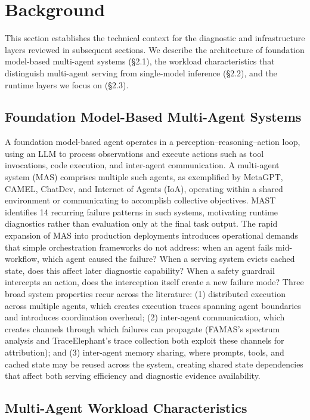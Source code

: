 \documentclass[preprint,12pt]{elsarticle}
\begin{document}
\section{Background}
This section establishes the technical context for the diagnostic and infrastructure layers reviewed in subsequent sections. We describe the architecture of foundation model-based multi-agent systems (\S{}2.1), the workload characteristics that distinguish multi-agent serving from single-model inference (\S{}2.2), and the runtime layers we focus on (\S{}2.3).


\subsection{Foundation Model-Based Multi-Agent Systems}



A foundation model-based agent operates in a perception--reasoning--action loop, using an LLM to process observations and execute actions such as tool invocations, code execution, and inter-agent communication. A multi-agent system (MAS) comprises multiple such agents, as exemplified by MetaGPT, CAMEL, ChatDev, and Internet of Agents (IoA), operating within a shared environment or communicating to accomplish collective objectives. MAST \cite{v5ref5} identifies 14 recurring failure patterns in such systems, motivating runtime diagnostics rather than evaluation only at the final task output. The rapid expansion of MAS into production deployments introduces operational demands that simple orchestration frameworks do not address: when an agent fails mid-workflow, which agent caused the failure? When a serving system evicts cached state, does this affect later diagnostic capability? When a safety guardrail intercepts an action, does the interception itself create a new failure mode? Three broad system properties recur across the literature: (1) distributed execution across multiple agents, which creates execution traces spanning agent boundaries and introduces coordination overhead; (2) inter-agent communication, which creates channels through which failures can propagate (FAMAS's spectrum analysis and TraceElephant's trace collection both exploit these channels for attribution); and (3) inter-agent memory sharing, where prompts, tools, and cached state may be reused across the system, creating shared state dependencies that affect both serving efficiency and diagnostic evidence availability.


\subsection{Multi-Agent Workload Characteristics}

\end{document}
